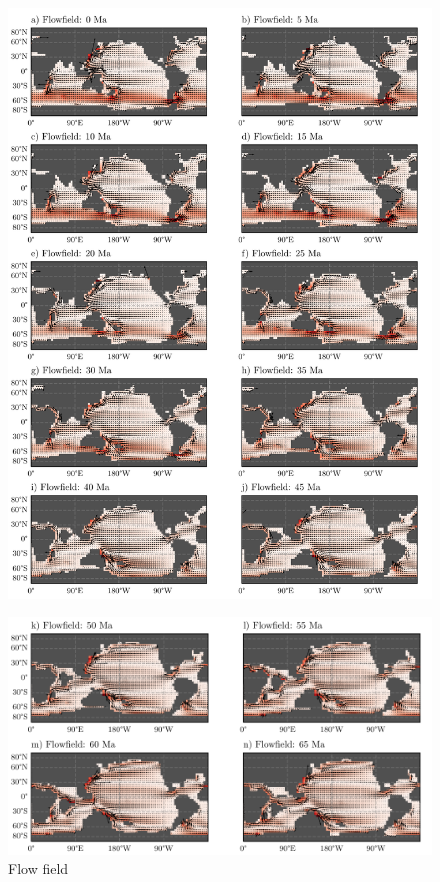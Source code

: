 \documentclass[a4paper]{article}
\begin{document}
\begin{figure}[H]
\includegraphics[width=\linewidth]{flowfield_1_crop.pdf}
\end{figure}
\begin{figure}[H]
\includegraphics[width=\linewidth]{flowfield_2_crop.pdf}
\caption{Flow field}
\label{fig:bathys}
\end{figure}
\end{document}
